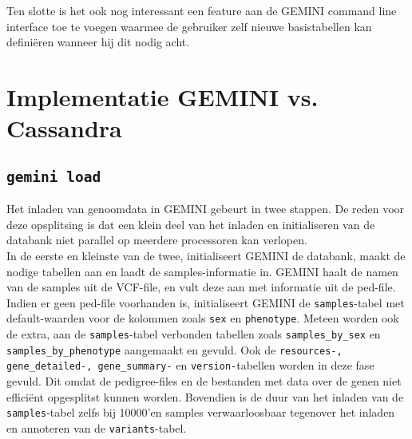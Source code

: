Ten slotte is het ook nog interessant een feature aan de GEMINI command line interface toe te voegen waarmee de gebruiker zelf nieuwe basistabellen kan defini\"eren wanneer hij dit nodig acht.

\section{Implementatie GEMINI vs. Cassandra}

\subsection{\texttt{gemini load}}

Het inladen van genoomdata in GEMINI gebeurt in twee stappen. De reden voor deze opsplitsing is dat een klein deel van het inladen en initialiseren van de databank niet parallel op meerdere processoren kan verlopen. \\In de eerste en kleinste van de twee, initialiseert GEMINI de databank, maakt de nodige tabellen aan en laadt de samples-informatie in. GEMINI haalt de namen van de samples uit de VCF-file, en vult deze aan met informatie uit de ped-file. Indien er geen ped-file voorhanden is, initialiseert GEMINI de \texttt{samples}-tabel met default-waarden voor de kolommen zoals \texttt{sex} en \texttt{phenotype}. Meteen worden ook de extra, aan de \texttt{samples}-tabel verbonden tabellen zoals \texttt{samples\_by\_sex} en \texttt{samples\_by\_phenotype} aangemaakt en gevuld. Ook de \texttt{resources-, gene\_detailed-, gene\_summary-} en \texttt{version-}tabellen worden in deze fase gevuld. Dit omdat de pedigree-files en de bestanden met data over de genen niet effici\"ent opgesplitst kunnen worden. Bovendien is de duur van het inladen van de \texttt{samples}-tabel zelfs bij 10000'en samples verwaarloosbaar tegenover het inladen en annoteren van de \texttt{variants}-tabel.\\

